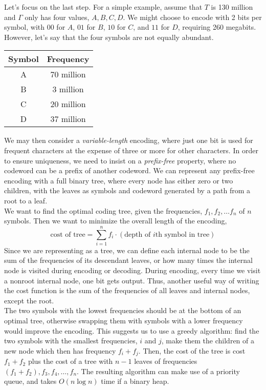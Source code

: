 Let's focus on the last step.
For a simple example, assume that $T$ is 130 million and $\Gamma $ only has four values, $A, B, C, D$.
We might choose to encode with 2 bits per symbol, with $00$ for $A$, $01$ for $B$, $10$ for $C$, and $11$ for $D$, requiring 260 megabits.\\
However, let's say that the four symbols are not equally abundant.
\begin{center}
\begin{tabular}{c c}
  Symbol & Frequency \\
  \hline
  A & 70 million\\
  B & 3 million\\
  C & 20 million\\
  D & 37 million\\
\end{tabular}
\end{center}
We may then consider a \textit{variable-length} encoding, where just one bit is used for frequent characters at the expense of three or more for other characters.
In order to ensure uniqueness, we need to insist on a \textit{prefix-free} property, where no codeword can be a prefix of another codeword.
We can represent any prefix-free encoding with a full binary tree, where every node has either zero or two children, with the leaves as symbols and codeword generated by a path from a root to a leaf.\\
We want to find the optimal coding tree, given the frequencies, $f_1, f_2, \ldots f_n$ of $n$ symbols.
Then we want to minimize the overall length of the encoding, $$\text{cost of tree} = \sum_{i=1}^{n} f_i \cdot (\text{depth of $i$th symbol in tree})$$
Since we are representing as a tree, we can define each internal node to be the sum of the frequencies of its descendant leaves, or how many times the internal node is visited during encoding or decoding.
During encoding, every time we visit a nonroot internal node, one bit gets output.
Thus, another useful way of writing the cost function is the sum of the frequencies of all leaves and internal nodes, except the root.\\
The two symbols with the lowest frequencies should be at the bottom of an optimal tree, otherwise swapping them with symbols with a lower frequency would improve the encoding.
This suggests us to use a greedy algorithm: find the two symbols with the smallest frequencies, $i$ and $j$, make them the children of a new node which then has frequency $f_i + f_j$.
Then, the cost of the tree is cost $f_1 + f_2$ plus the cost of a tree with $n-1$ leaves of frequencies $(f_1 + f_2), f_3, f_4, \ldots, f_n$.
The resulting algorithm can make use of a priority queue, and takes $O(n \log n)$ time if a binary heap.

